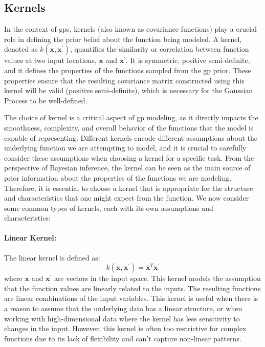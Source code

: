 \subsection{Kernels}
\label{section:kernels}
In the context of \acfp{gp}, kernels (also known as covariance functions) play a crucial role in defining the prior belief about the function being modeled. A kernel, denoted as $k(\mathbf{x}, \mathbf{x}^\prime)$, quantifies the similarity or correlation between function values at two input locations, $\mathbf{x}$ and $\mathbf{x}^\prime$. It is symmetric, positive semi-definite, and it defines the properties of the functions sampled from the \ac{gp} prior. These properties ensure that the resulting covariance matrix constructed using this kernel will be valid (positive semi-definite), which is necessary for the Gaussian Process to be well-defined.

The choice of kernel is a critical aspect of \ac{gp} modeling, as it directly impacts the smoothness, complexity, and overall behavior of the functions that the model is capable of representing. Different kernels encode different assumptions about the underlying function we are attempting to model, and it is crucial to carefully consider these assumptions when choosing a kernel for a specific task. From the perspective of Bayesian inference, the kernel can be seen as the main source of prior information about the properties of the functions we are modeling. Therefore, it is essential to choose a kernel that is appropriate for the structure and characteristics that one might expect from the function. We now consider some common types of kernels, each with its own assumptions and characteristics:

\paragraph{Linear Kernel:}
The linear kernel is defined as:
\[k(\mathbf{x}, \mathbf{x}^\prime) = \mathbf{x}^T \mathbf{x}^\prime\]
where $\mathbf{x}$ and $\mathbf{x}^\prime$ are vectors in the input space. This kernel models the assumption that the function values are linearly related to the inputs. The resulting functions are linear combinations of the input variables. This kernel is useful when there is a reason to assume that the underlying data has a linear structure, or when working with high-dimensional data where the kernel has less sensitivity to changes in the input. However, this kernel is often too restrictive for complex functions due to its lack of flexibility and can't capture non-linear patterns. 

